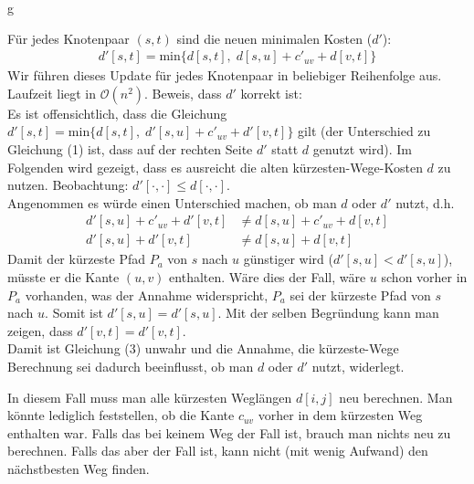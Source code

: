 \documentclass[11pt]{scrartcl} %
\begin{document}
\begin{compactenum}[(a)]g
\item Für jedes Knotenpaar $(s,t)$ sind die neuen minimalen Kosten ($d'$):
\begin{align}
    d'[s,t] = \text{min}\{d[s,t],\; d[s,u] + c'_{uv} + d[v,t]\}
\end{align}
Wir führen dieses Update für jedes Knotenpaar in beliebiger Reihenfolge aus. Laufzeit liegt in $\mathcal O(n^2)$. Beweis, dass $d'$ korrekt ist:\\[0.3cm]
Es ist offensichtlich, dass die Gleichung $d'[s,t] = \text{min}\{d[s,t],\; d'[s,u] + c'_{uv} + d'[v,t]\}$ gilt (der Unterschied zu Gleichung (1) ist, dass auf der rechten Seite $d'$ statt $d$ genutzt wird). Im Folgenden wird gezeigt, dass es ausreicht die alten kürzesten-Wege-Kosten $d$ zu nutzen. Beobachtung: $d'[\cdot,\cdot] \le d[\cdot,\cdot]$.\\
Angenommen es würde einen Unterschied machen, ob man $d$ oder $d'$ nutzt, d.h.
\begin{align}
    d'[s,u] + c'_{uv} + d'[v,t] &\ne d[s,u] + c'_{uv} + d[v,t]\\
    d'[s,u] + d'[v,t] &\ne d[s,u] + d[v,t]
\end{align}
Damit der kürzeste Pfad $P_a$ von $s$ nach $u$ günstiger wird ($d'[s,u] < d'[s,u]$), müsste er die Kante $(u,v)$ enthalten. Wäre dies der Fall, wäre $u$ schon vorher in $P_a$ vorhanden, was der Annahme widerspricht, $P_a$ sei der kürzeste Pfad von $s$ nach $u$. Somit ist $d'[s,u] = d'[s,u]$. Mit der selben Begründung kann man zeigen, dass $d'[v,t] = d'[v,t]$.\\[0.3cm]
Damit ist Gleichung (3) unwahr und die Annahme, die kürzeste-Wege Berechnung sei dadurch beeinflusst, ob man $d$ oder $d'$ nutzt, widerlegt.\\

\item In diesem Fall muss man alle kürzesten Weglängen $d[i,j]$ neu berechnen. Man könnte lediglich feststellen, ob die Kante $c_{uv}$ vorher in dem kürzesten Weg enthalten war. Falls das bei keinem Weg der Fall ist, brauch man nichts neu zu berechnen. Falls das aber der Fall ist, kann nicht (mit wenig Aufwand) den nächstbesten Weg finden.



\end{compactenum}
\end{document}
